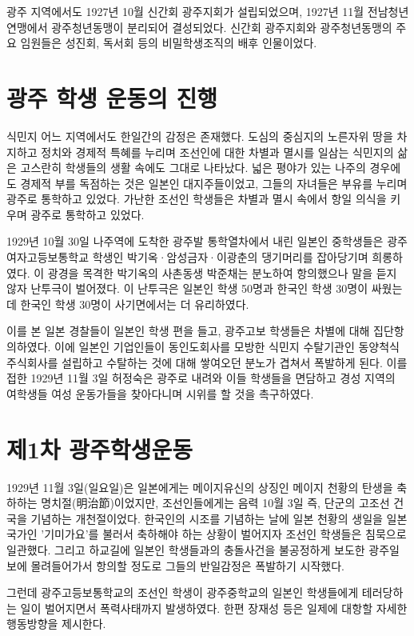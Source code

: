광주 지역에서도 1927년 10월 신간회 광주지회가 설립되었으며, 1927년 11월 전남청년연맹에서 광주청년동맹이 분리되어 결성되었다. 신간회 광주지회와 광주청년동맹의 주요 임원들은 성진회, 독서회 등의 비밀학생조직의 배후 인물이었다.

\section{광주 학생 운동의 진행}
식민지 어느 지역에서도 한일간의 감정은 존재했다. 도심의 중심지의 노른자위 땅을 차지하고 정치와 경제적 특혜를 누리며 조선인에 대한 차별과 멸시를 일삼는 식민지의 삶은 고스란히 학생들의 생활 속에도 그대로 나타났다. 넓은 평야가 있는 나주의 경우에도 경제적 부를 독점하는 것은 일본인 대지주들이었고, 그들의 자녀들은 부유를 누리며 광주로 통학하고 있었다. 가난한 조선인 학생들은 차별과 멸시 속에서 항일 의식을 키우며 광주로 통학하고 있었다.

1929년 10월 30일 나주역에 도착한 광주발 통학열차에서 내린 일본인 중학생들은 광주여자고등보통학교 학생인 박기옥·암성금자·이광춘의 댕기머리를 잡아당기며 희롱하였다. 이 광경을 목격한 박기옥의 사촌동생 박준채는 분노하여 항의했으나 말을 듣지 않자 난투극이 벌어졌다. 이 난투극은 일본인 학생 50명과 한국인 학생 30명이 싸웠는데 한국인 학생 30명이 사기면에서는 더 유리하였다.

이를 본 일본 경찰들이 일본인 학생 편을 들고, 광주고보 학생들은 차별에 대해 집단항의하였다. 이에 일본인 기업인들이 동인도회사를 모방한 식민지 수탈기관인 동양척식주식회사를 설립하고 수탈하는 것에 대해 쌓여오던 분노가 겹쳐서 폭발하게 된다. 이를 접한 1929년 11월 3일 허정숙은 광주로 내려와 이들 학생들을 면담하고 경성 지역의 여학생들 여성 운동가들을 찾아다니며 시위를 할 것을 촉구하였다.

\section{제1차 광주학생운동}
1929년 11월 3일(일요일)은 일본에게는 메이지유신의 상징인 메이지 천황의 탄생을 축하하는 명치절(明治節)이었지만, 조선인들에게는 음력 10월 3일 즉, 단군의 고조선 건국을 기념하는 개천절이었다. 한국인의 시조를 기념하는 날에 일본 천황의 생일을 일본 국가인 '기미가요'를 불러서 축하해야 하는 상황이 벌어지자 조선인 학생들은 침묵으로 일관했다. 그리고 하교길에 일본인 학생들과의 충돌사건을 불공정하게 보도한 광주일보에 몰려들어가서 항의할 정도로 그들의 반일감정은 폭발하기 시작했다.

그런데 광주고등보통학교의 조선인 학생이 광주중학교의 일본인 학생들에게 테러당하는 일이 벌어지면서 폭력사태까지 발생하였다. 한편 장재성 등은 일제에 대항할 자세한 행동방향을 제시한다.

